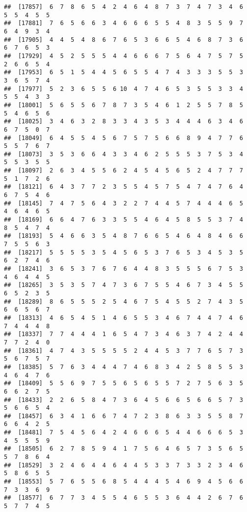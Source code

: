 \documentclass[
]{book}
\begin{document}
\begin{verbatim}
##  [17857]  6  7  8  6  5  4  2  4  6  4  8  7  3  7  4  7  3  4  6  5  5  4  5  5
##  [17881]  7  6  5  6  6  3  4  6  6  6  5  5  4  8  3  5  5  9  7  6  4  9  3  4
##  [17905]  4  4  5  4  8  6  7  6  5  3  6  6  5  4  6  8  7  3  6  6  7  6  5  3
##  [17929]  4  5  2  5  5  5  4  4  6  6  6  7  5  6  4  7  5  7  5  2  6  6  5  4
##  [17953]  6  5  1  5  4  4  5  6  5  5  4  7  4  3  3  3  5  5  3  3  6  5  7  4
##  [17977]  5  2  3  6  5  5  6 10  4  7  4  6  5  3  5  5  3  3  4  5  5  4  3  3
##  [18001]  5  6  5  5  6  7  8  7  3  5  4  6  1  2  5  5  7  8  5  5  4  6  5  6
##  [18025]  3  4  6  3  2  8  3  3  4  3  5  3  4  4  4  6  3  4  6  6  7  5  0  7
##  [18049]  6  4  5  5  4  5  6  7  5  7  5  6  6  8  9  4  7  7  6  5  5  7  6  7
##  [18073]  3  5  3  6  6  4  3  3  4  6  2  5  5  5  3  7  5  3  4  5  5  3  5  5
##  [18097]  2  6  3  4  5  5  6  2  4  5  4  5  6  5  2  4  7  7  7  5  1  7  2  6
##  [18121]  6  4  3  7  7  2  3  5  5  4  5  7  5  4  7  4  7  6  4  6  7  5  4  6
##  [18145]  7  4  7  5  6  4  3  2  2  7  4  4  5  7  4  4  4  6  5  4  6  4  6  5
##  [18169]  6  6  4  7  6  3  3  5  5  4  6  4  5  8  5  5  3  7  4  8  5  4  7  4
##  [18193]  5  4  6  6  3  5  4  8  7  6  6  5  4  6  4  8  4  6  6  7  5  5  6  3
##  [18217]  5  5  5  5  3  5  4  5  6  5  3  7  6  5  3  4  5  3  5  6  2  7  4  6
##  [18241]  3  6  5  3  7  6  7  6  4  4  8  3  5  5  5  6  7  5  3  4  6  4  4  5
##  [18265]  3  5  3  5  7  4  7  3  6  7  5  5  4  6  7  3  4  5  5  6  5  2  3  5
##  [18289]  8  6  5  5  5  2  5  4  6  7  5  4  5  5  2  7  4  3  5  6  6  5  6  7
##  [18313]  4  6  5  4  5  1  4  6  5  5  3  4  6  7  4  4  7  4  6  7  4  4  4  8
##  [18337]  7  7  4  4  4  1  6  5  4  7  3  4  6  3  7  4  2  4  4  7  7  2  4  0
##  [18361]  4  7  4  3  5  5  5  5  2  4  4  5  3  7  7  6  5  7  3  5  6  7  5  7
##  [18385]  5  7  6  3  4  4  4  7  4  6  8  3  4  2  5  8  5  5  3  4  6  4  7  6
##  [18409]  5  5  6  9  7  5  5  6  5  6  5  5  7  2  7  5  6  3  5  6  6  2  7  5
##  [18433]  2  2  6  5  8  4  7  3  6  4  5  6  6  5  6  6  5  7  3  5  6  6  5  4
##  [18457]  6  3  4  1  6  6  7  4  7  2  3  8  6  3  3  5  5  8  7  6  6  4  2  5
##  [18481]  7  5  4  5  6  4  2  4  6  6  6  5  4  4  6  6  6  5  3  4  5  5  5  9
##  [18505]  6  2  7  8  5  9  4  1  7  5  6  4  6  5  7  3  5  6  5  5  7  8  6  4
##  [18529]  3  2  4  6  4  4  6  4  4  5  3  3  7  3  3  2  3  4  6  5  8  6  5  5
##  [18553]  5  7  6  5  5  6  8  5  4  4  4  5  4  6  9  4  5  6  6  7  3  3  6  9
##  [18577]  6  7  7  3  4  5  5  4  6  5  5  3  6  4  4  2  6  7  6  5  7  7  4  5

\end{verbatim}
\end{document}
